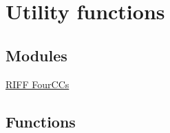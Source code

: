 \hypertarget{group__lavf__misc}{}\section{Utility functions}
\label{group__lavf__misc}
\subsection*{Modules}
\begin{DoxyCompactItemize}
\item 
\hyperlink{group__riff__fourcc}{R\+I\+F\+F Four\+C\+Cs}
\end{DoxyCompactItemize}
\subsection*{Functions}
